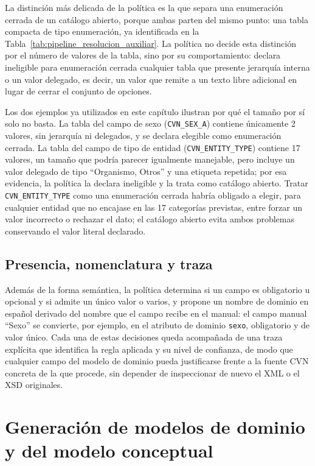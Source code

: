 La distinción más delicada de la política es la que separa una enumeración
cerrada de un catálogo abierto, porque ambas parten del mismo punto: una
tabla compacta de tipo enumeración, ya identificada en la
Tabla~\ref{tab:pipeline_resolucion_auxiliar}. La política no decide esta
distinción por el número de valores de la tabla, sino por su comportamiento:
declara ineligible para enumeración cerrada cualquier tabla que presente
jerarquía interna o un valor delegado, es decir, un valor que remite a un
texto libre adicional en lugar de cerrar el conjunto de opciones.

Los dos ejemplos ya utilizados en este capítulo ilustran por qué el tamaño
por sí solo no basta. La tabla del campo de sexo (\texttt{CVN\_SEX\_A})
contiene únicamente 2 valores, sin jerarquía ni delegados, y se declara
elegible como enumeración cerrada. La tabla del campo de tipo de entidad
(\texttt{CVN\_ENTITY\_TYPE}) contiene 17 valores, un tamaño que podría
parecer igualmente manejable, pero incluye un valor delegado de tipo
``Organismo, Otros'' y una etiqueta repetida; por esa evidencia, la política
la declara ineligible y la trata como catálogo abierto. Tratar
\texttt{CVN\_ENTITY\_TYPE} como una enumeración cerrada habría obligado a
elegir, para cualquier entidad que no encajase en las 17 categorías
previstas, entre forzar un valor incorrecto o rechazar el dato; el catálogo
abierto evita ambos problemas conservando el valor literal declarado.

\subsection{Presencia, nomenclatura y traza}
\label{sec:pipeline_politica_presencia}

Además de la forma semántica, la política determina si un campo es
obligatorio u opcional y si admite un único valor o varios, y propone un
nombre de dominio en español derivado del nombre que el campo recibe en el
manual: el campo manual ``Sexo'' se convierte, por ejemplo, en el atributo de
dominio \texttt{sexo}, obligatorio y de valor único. Cada una de estas
decisiones queda acompañada de una traza explícita que identifica la regla
aplicada y su nivel de confianza, de modo que cualquier campo del modelo de
dominio pueda justificarse frente a la fuente CVN concreta de la que
procede, sin depender de inspeccionar de nuevo el XML o el XSD originales.

\section{Generación de modelos de dominio y del modelo conceptual}
\label{sec:pipeline_modelos_dominio}

